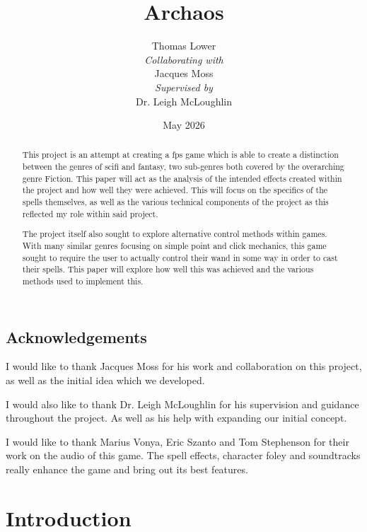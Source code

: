 \documentclass[12pt,a4paper]{report}
\title{Archaos}
\author{Thomas Lower\\
\textit{Collaborating with}\\
Jacques Moss\\
\textit{Supervised by}\\
Dr. Leigh McLoughlin}
\date{May 2026}
\begin{document}
\maketitle

\begin{abstract}
    This project is an attempt at creating a \gls{fps} game which is able to create a distinction between the genres of \gls{scifi} and \gls{fantasy}, two sub-genres both covered by the overarching genre Fiction. This paper will act as the analysis of the intended effects created within the project and how well they were achieved. This will focus on the specifics of the spells themselves, as well as the various technical components of the project as this reflected my role within said project.

    The project itself also sought to explore alternative control methods within games. With many similar genres focusing on simple point and click mechanics, this game sought to require the user to actually control their wand in some way in order to cast their spells. This paper will explore how well this was achieved and the various methods used to implement this.
\end{abstract}

\pagebreak

\section*{Acknowledgements}
I would like to thank Jacques Moss for his work and collaboration on this project, as well as the initial idea which we developed.

I would also like to thank Dr. Leigh McLoughlin for his supervision and guidance throughout the project. As well as his help with expanding our initial concept.

I would like to thank Marius Vonya, Eric Szanto and Tom Stephenson for their work on the audio of this game. The spell effects, character foley and soundtracks really enhance the game and bring out its best features.

\pagebreak

\tableofcontents

\pagebreak

\listoffigures

\listoftables

\printglossaries

\chapter{Introduction} \label{intro}
\end{document}
